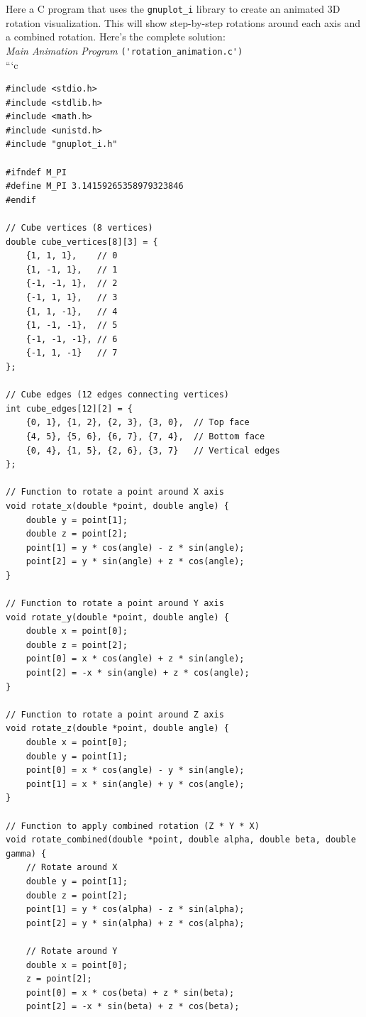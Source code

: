 \documentclass[a4paper,10pt]{article}
\begin{document}
Here a C program that uses the \verb|gnuplot_i| library to create an animated 3D rotation visualization. This will show step-by-step rotations around each axis and a combined rotation.
Here's the complete solution:\\
\emph{Main Animation Program} \verb|('rotation_animation.c')|\\
```c\\
\begin{verbatim}
#include <stdio.h>
#include <stdlib.h>
#include <math.h>
#include <unistd.h>
#include "gnuplot_i.h"

#ifndef M_PI
#define M_PI 3.14159265358979323846
#endif

// Cube vertices (8 vertices)
double cube_vertices[8][3] = {
    {1, 1, 1},    // 0
    {1, -1, 1},   // 1
    {-1, -1, 1},  // 2
    {-1, 1, 1},   // 3
    {1, 1, -1},   // 4
    {1, -1, -1},  // 5
    {-1, -1, -1}, // 6
    {-1, 1, -1}   // 7
};

// Cube edges (12 edges connecting vertices)
int cube_edges[12][2] = {
    {0, 1}, {1, 2}, {2, 3}, {3, 0},  // Top face
    {4, 5}, {5, 6}, {6, 7}, {7, 4},  // Bottom face
    {0, 4}, {1, 5}, {2, 6}, {3, 7}   // Vertical edges
};

// Function to rotate a point around X axis
void rotate_x(double *point, double angle) {
    double y = point[1];
    double z = point[2];
    point[1] = y * cos(angle) - z * sin(angle);
    point[2] = y * sin(angle) + z * cos(angle);
}

// Function to rotate a point around Y axis
void rotate_y(double *point, double angle) {
    double x = point[0];
    double z = point[2];
    point[0] = x * cos(angle) + z * sin(angle);
    point[2] = -x * sin(angle) + z * cos(angle);
}

// Function to rotate a point around Z axis
void rotate_z(double *point, double angle) {
    double x = point[0];
    double y = point[1];
    point[0] = x * cos(angle) - y * sin(angle);
    point[1] = x * sin(angle) + y * cos(angle);
}

// Function to apply combined rotation (Z * Y * X)
void rotate_combined(double *point, double alpha, double beta, double gamma) {
    // Rotate around X
    double y = point[1];
    double z = point[2];
    point[1] = y * cos(alpha) - z * sin(alpha);
    point[2] = y * sin(alpha) + z * cos(alpha);

    // Rotate around Y
    double x = point[0];
    z = point[2];
    point[0] = x * cos(beta) + z * sin(beta);
    point[2] = -x * sin(beta) + z * cos(beta);


\end{verbatim}
\end{document}
